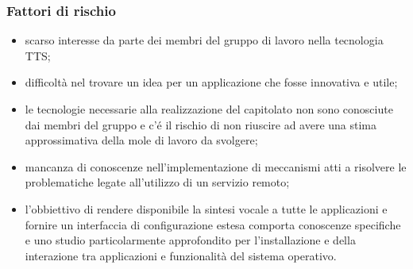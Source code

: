 \documentclass[12pt,a4paper]{article}
\begin{document}
\subsubsection{Fattori di rischio}
\begin{itemize}
\item scarso interesse da parte dei membri del gruppo di lavoro nella tecnologia TTS;
\item difficoltà nel trovare un idea per un applicazione che fosse innovativa e utile;
\item le tecnologie necessarie alla realizzazione del capitolato non sono conosciute dai membri del gruppo e c'é il rischio di non riuscire ad avere una stima approssimativa della mole di lavoro da svolgere;
\item mancanza di conoscenze nell'implementazione di meccanismi atti a risolvere le problematiche legate all'utilizzo di un servizio remoto;
\item l'obbiettivo di rendere disponibile la sintesi vocale a tutte le applicazioni e fornire un interfaccia di configurazione estesa comporta conoscenze specifiche e uno studio particolarmente approfondito per l'installazione e della interazione tra applicazioni e funzionalità del sistema operativo.
\end{itemize}
\end{document}
